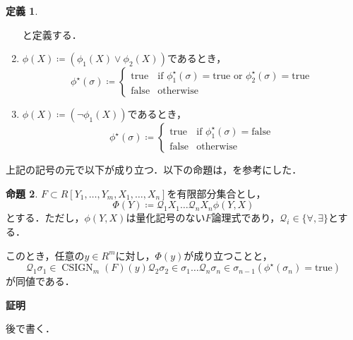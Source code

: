 \documentclass[uplatex, dvipdfmx]{jsarticle}
\makeatletter
\numberwithin{equation}{section}
\renewenvironment{proof}[1][\proofname]{\par
  \pushQED{\qed}%
  \normalfont \topsep6\p@\@plus6\p@\relax
  \trivlist
  \item\relax
  {\bfseries
  #1\@addpunct{.}}\hspace\labelsep\ignorespaces
}{
  \popQED\endtrivlist\@endpefalse
}
\newcommand{\Qua}{\mathcal{Q}}
\newcommand{\true}{\text{true}}
\newcommand{\false}{\text{false}}
\DeclareMathOperator{\CSIGN}{CSIGN}
\theoremstyle{definition}
\newtheorem{definition}{定義}[section]
\newtheorem{proposition}[definition]{命題}
\renewcommand{\proofname}{\textbf{証明}}
\makeatother
\begin{document}
\begin{definition}
\begin{enumerate}
          と定義する．
          \item $\phi(X)\coloneqq (\phi_1(X) \lor \phi_2(X))$であるとき，
          \begin{equation}
               \phi^\star(\sigma)\coloneqq \begin{cases}
                    \true  & \text{if $\phi_1^\star(\sigma)=\true$ or $\phi_2^\star(\sigma)=\true$}\\
                    \false & \text{otherwise}
               \end{cases}
          \end{equation}
          \item $\phi(X)\coloneqq (\lnot \phi_1(X))$であるとき，
          \begin{equation}
               \phi^\star(\sigma)\coloneqq \begin{cases}
                    \true  & \text{if $\phi_1^\star(\sigma)=\false$}\\
                    \false & \text{otherwise}
               \end{cases}
          \end{equation}
     \end{enumerate}
\end{definition}

上記の記号の元で以下が成り立つ．以下の命題は，\cite[Proposition 11.14.]{MR2248869}を参考にした．
\begin{proposition}
     $F \subset R[Y_1, \dots, Y_m, X_1, \dots, X_n]$を有限部分集合とし，
     \begin{equation}
          \Phi(Y)\coloneqq \Qua_1 X_1 \dots \Qua_n X_n \phi(Y,X)
     \end{equation}
     とする．ただし，$\phi(Y,X)$は量化記号のない$F$論理式であり，$\Qua_i \in \{\forall, \exists\}$とする．

     このとき，任意の$y \in R^m$に対し，$\Phi(y)$が成り立つことと，
     \begin{equation}
          \Qua_1 \sigma_1 \in \CSIGN_m(F)(y) \Qua_2 \sigma_2 \in \sigma_1 \dots \Qua_n \sigma_n \in \sigma_{n-1} (\phi^\star(\sigma_n) = \true)
     \end{equation}
     が同値である．
\end{proposition}

\begin{proof}
     後で書く．
\end{proof}
\end{document}
